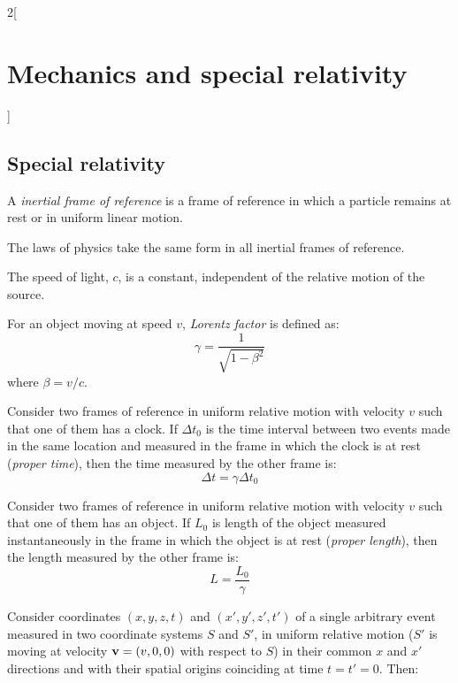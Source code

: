 \documentclass[../../../main_physics.tex]{subfiles}
\begin{document}
\begin{multicols}{2}[\section{Mechanics and special relativity}]
  \subsection{Special relativity}
  \begin{definition}
    A \emph{inertial frame of reference} is a frame of reference in which a particle remains at rest or in uniform linear motion.
  \end{definition}
  \begin{principle}
    The laws of physics take the same form in all inertial frames of reference.
  \end{principle}
  \begin{principle}
    The speed of light, $c$, is a constant, independent of the relative motion of the source.
  \end{principle}
  \begin{definition}
    For an object moving at speed $v$, \emph{Lorentz factor} is defined as:
    $$\gamma=\frac{1}{\sqrt{1-\beta^2}}$$ where $\beta=v/c$.
  \end{definition}
  \begin{proposition}
    Consider two frames of reference in uniform relative motion with velocity $v$ such that one of them has a clock. If $\Delta t_0$ is the time interval between two events made in the same location and measured in the frame in which the clock is at rest (\emph{proper time}), then the time measured by the other frame is:
    $$\Delta t=\gamma\Delta t_0$$
  \end{proposition}
  \begin{proposition}
    Consider two frames of reference in uniform relative motion with velocity $v$ such that one of them has an object. If $L_0$ is length of the object measured instantaneously in the frame in which the object is at rest (\emph{proper length}), then the length measured by the other frame is:
    $$L=\frac{L_0}{\gamma}$$
  \end{proposition}
  \begin{proposition}
    Consider coordinates $(x,y,z,t)$ and $(x',y',z',t')$ of a single arbitrary event measured in two coordinate systems $S$ and $S'$, in uniform relative motion ($S'$ is moving at velocity $\boldsymbol{\mathrm{v}}=(v,0,0)$ with respect to $S$) in their common $x$ and $x'$ directions and  with their spatial origins coinciding at time $t=t'=0$. Then:
    \begin{align*}

\end{align*}
\end{proposition}
\end{multicols}
\end{document}
